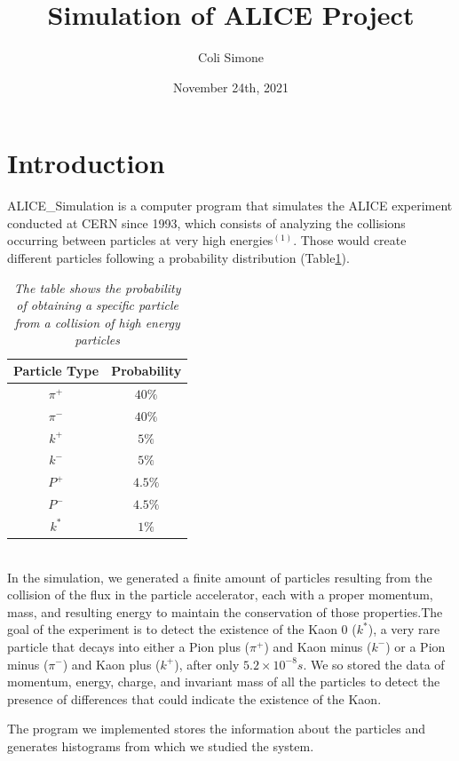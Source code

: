 \documentclass[a4paper, 11pt]{article}
\begin{document}
  \title{Simulation of ALICE Project}
  \author{Coli Simone}
  \date{November 24th, 2021}
  \maketitle
  \section{Introduction}

  ALICE\_Simulation is a computer program that simulates the ALICE experiment conducted at CERN since 1993, which consists of analyzing the collisions occurring between particles at very high energies$^{(1)}$. Those would create different particles following a probability distribution (Table\ref{table1}).
    \begin{table}[h!]
      \centering
      \begin{tabular}{ c c }
        \hline
        Particle Type & Probability \\
        \hline
        $\pi^+$ & $40\%$ \\
        $\pi^-$ & $40\%$ \\
        $k^+$ & $5\%$\\
        $k^-$ & $5\%$\\
        $P^+$ & $4.5\%$\\
        $P^-$ & $4.5\%$\\
        $k^*$ & $1\%$\\
        \hline
      \end{tabular}
      \caption{ \label{table1}
      \textit{The table shows the probability of obtaining a specific particle from a collision of high energy particles}
      }
    \end{table}\\

    In the simulation, we generated a finite amount of particles resulting from the collision of the flux in the particle accelerator, each with a proper momentum, mass, and resulting energy to maintain the conservation of those properties.The goal of the experiment is to detect the existence of the Kaon 0 ($k^*$), a very rare particle that decays into either a Pion plus ($\pi^+$) and Kaon minus ($k^-$) or a Pion minus ($\pi^-$) and Kaon plus ($k^+$), after only $5.2 \times 10^{-8}s$. We so stored the data of momentum, energy, charge, and invariant mass of all the particles to detect the presence of differences that could indicate the existence of the Kaon.

    The program we implemented stores the information about the particles and generates histograms from which we studied the system.
\end{document}
